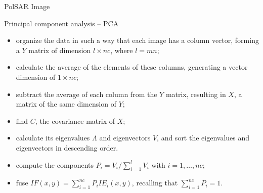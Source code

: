 \documentclass[10pt]{beamer}
\begin{document}

\begin{frame}[fragile]{PolSAR Image}
\begin{alertblock}{Principal component analysis -- PCA}
\begin{itemize}
	\item organize the data in such a way that each image has a column vector, forming a $Y$ matrix of dimension $l\times nc$, where $l=m n$;
\item calculate the average of the elements of these columns, generating a vector dimension of $1\times nc$;
\item subtract the average of each column from the $Y$ matrix, resulting in $X$, a matrix of the same dimension of $Y$; 
\item find $C$, the covariance matrix of $X$;
\item calculate its eigenvalues $\Lambda$ and eigenvectors $V$, and sort the eigenvalues and eigenvectors in descending order.
\item compute the components $P_i=V_i/{\sum_{i=1}^l V_i}$ with $i=1,\dots,nc$;
\item fuse $IF(x,y)=\sum_{i=1}^{nc}P_iIE_i(x,y)$, recalling that $\sum_{i=1}^{nc}P_i=1$.
\end{itemize}
\end{alertblock}
\end{frame}
\end{document}
